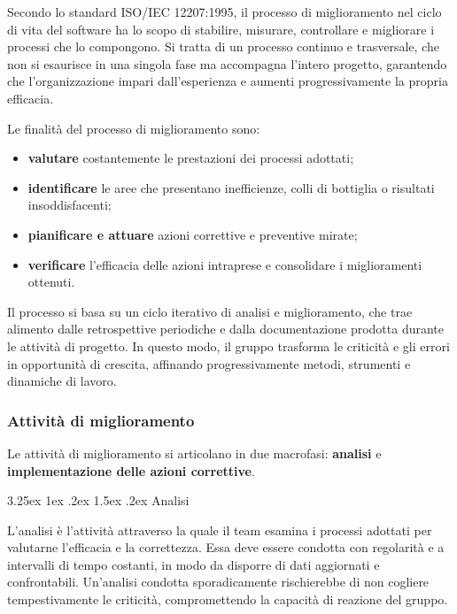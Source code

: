 \documentclass[a4paper, 10pt]{article}
\makeatletter
\renewcommand\paragraph{\@startsection{paragraph}{4}{\z@}%
  {3.25ex \@plus1ex \@minus .2ex}%
  {1.5ex \@plus .2ex}%
  {\normalfont\normalsize\bfseries}}
\makeatother
\begin{document}
Secondo lo standard ISO/IEC 12207:1995, il processo di miglioramento nel ciclo di vita del software ha lo scopo di stabilire, misurare, controllare e migliorare i processi che lo compongono. Si tratta di un processo continuo e trasversale, che non si esaurisce in una singola fase ma accompagna l'intero progetto, garantendo che l'organizzazione impari dall'esperienza e aumenti progressivamente la propria efficacia.

Le finalità del processo di miglioramento sono:
\begin{itemize}
    \item \textbf{valutare} costantemente le prestazioni dei processi adottati;
    \item \textbf{identificare} le aree che presentano inefficienze, colli di bottiglia o risultati insoddisfacenti;
    \item \textbf{pianificare e attuare} azioni correttive e preventive mirate;
    \item \textbf{verificare} l'efficacia delle azioni intraprese e consolidare i miglioramenti ottenuti.
\end{itemize}

Il processo si basa su un ciclo iterativo di analisi e miglioramento, che trae alimento dalle retrospettive periodiche e dalla documentazione prodotta durante le attività di progetto. In questo modo, il gruppo trasforma le criticità e gli errori in opportunità di crescita, affinando progressivamente metodi, strumenti e dinamiche di lavoro.

\subsubsection{Attività di miglioramento}
\label{subsubsec:attivita_miglioramento}

Le attività di miglioramento si articolano in due macrofasi: \textbf{analisi} e \textbf{implementazione delle azioni correttive}.

\paragraph{Analisi}

L'analisi è l'attività attraverso la quale il team esamina i processi adottati per valutarne l'efficacia e la correttezza. Essa deve essere condotta con regolarità e a intervalli di tempo costanti, in modo da disporre di dati aggiornati e confrontabili. Un'analisi condotta sporadicamente rischierebbe di non cogliere tempestivamente le criticità, compromettendo la capacità di reazione del gruppo.
\end{document}
